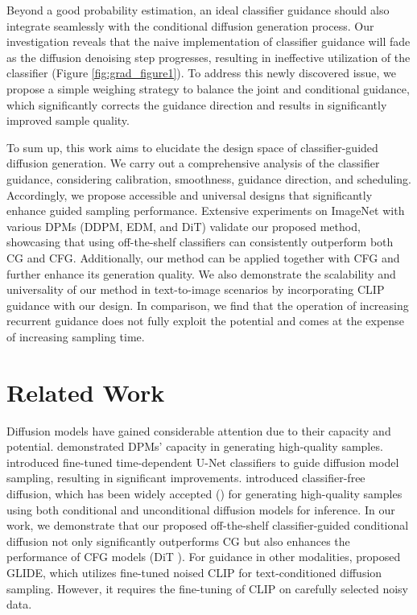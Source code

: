 \documentclass{article}
\theoremstyle{definition}
\begin{document}
Beyond a good probability estimation, an ideal classifier guidance should also integrate seamlessly with the conditional diffusion generation process. 
Our investigation reveals that the naive implementation of classifier guidance will fade as the diffusion denoising step progresses, resulting in ineffective utilization of the classifier (Figure \ref{fig:grad_figure1}). 
To address this newly discovered issue, we propose a simple weighing strategy to balance the joint and conditional guidance, which significantly corrects the guidance direction and results in significantly improved sample quality. 

To sum up, this work aims to elucidate the design space of classifier-guided diffusion generation. 
We carry out a comprehensive analysis of the classifier guidance, considering calibration, smoothness, guidance direction, and scheduling. Accordingly, we propose accessible and universal designs that significantly enhance guided sampling performance.
Extensive experiments on ImageNet with various DPMs (DDPM, EDM, and DiT) validate our proposed method, showcasing that using off-the-shelf classifiers can consistently outperform both CG and CFG. 
Additionally, our method can be applied together with CFG and further enhance its generation quality.
We also demonstrate the scalability and universality of our method in text-to-image scenarios by incorporating CLIP \citep{radford2021learning} guidance with our design.  
In comparison, we find that the operation of increasing recurrent guidance \citep{bansal2023universal} does not fully exploit the potential and comes at the expense of increasing sampling time. 


\section{Related Work}
Diffusion models have gained considerable attention due to their capacity and potential. \cite{ho2020denoising,nichol2021improved,song2020denoising,peebles2022scalable,karras2022edm} demonstrated DPMs' capacity in generating high-quality samples. 
\cite{dhariwal2021diffusion} introduced fine-tuned time-dependent U-Net \citep{ronneberger2015u} classifiers to guide diffusion model sampling, resulting in significant improvements. 
\cite{ho2022classifier} introduced classifier-free diffusion, which has been widely accepted (\cite{rombach2022high,peebles2022scalable,ramesh2022hierarchical}) for generating high-quality samples using both conditional and unconditional diffusion models for inference.
In our work, we demonstrate that our proposed off-the-shelf classifier-guided conditional diffusion not only significantly outperforms CG but also enhances the performance of CFG models (DiT \cite{peebles2022scalable}).  
For guidance in other modalities, \cite{nichol2021glide} proposed GLIDE, which utilizes fine-tuned noised CLIP for text-conditioned diffusion sampling. However, it requires the fine-tuning of CLIP on carefully selected noisy data.
\end{document}
